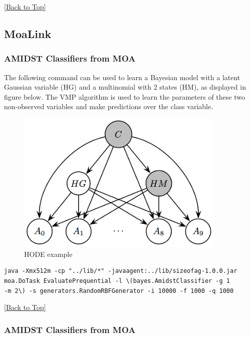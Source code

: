 \documentclass[10pt,a4paper]{article}
\begin{document}
\hyperref[sec:bns]{[Back to Top]}\newline 



\subsection{MoaLink}\label{sec:bns:moalink}
\subsubsection{AMIDST Classifiers from MOA}\label{sec:bns:moalink:moaclass}

The following command can be used to learn a Bayesian model with a latent Gaussian variable (HG) and a multinomial with 2 states (HM), as displayed in figure below. The VMP algorithm is used to learn the parameters of these two non-observed variables and make predictions over the class variable.

\begin{figure}[h!]
	\centering
	\includegraphics[width=10cm]{img/HODE.jpg}
	\caption{HODE example}
	\label{fig:bns:moalink:HODE}	
\end{figure}

\begin{lstlisting}
java -Xmx512m -cp "../lib/*" -javaagent:../lib/sizeofag-1.0.0.jar 
moa.DoTask EvaluatePrequential -l \(bayes.AmidstClassifier -g 1 
-m 2\) -s generators.RandomRBFGenerator -i 10000 -f 1000 -q 1000
\end{lstlisting}
\hyperref[sec:bns]{[Back to Top]}\newline 




\subsubsection{AMIDST Classifiers from MOA}\label{sec:bns:moalink:moareg}
\end{document}

